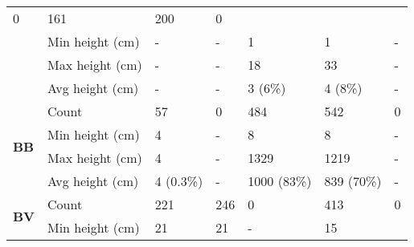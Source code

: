 \begin{longtable}{|p{2cm}|p{2cm}|p{1.5cm}|p{1.5cm}|p{1.5cm}|p{1.5cm}|p{1.5cm}|}
						\multicolumn{1}{l|}{0} &
						\multicolumn{1}{l|}{161} & 
						\multicolumn{1}{l|}{200} &
						\multicolumn{1}{l|}{0} \\\cline{2-7} &
						\multicolumn{1}{l|}{Min height (cm)} & 
						\multicolumn{1}{l|}{-} & 
						\multicolumn{1}{l|}{-} &
						\multicolumn{1}{l|}{1} & 
						\multicolumn{1}{l|}{1} &
						\multicolumn{1}{l|}{-} \\\cline{2-7} &
						\multicolumn{1}{l|}{Max height (cm)} & 
						\multicolumn{1}{l|}{-} & 
						\multicolumn{1}{l|}{-} &
						\multicolumn{1}{l|}{18} & 
						\multicolumn{1}{l|}{33} &
						\multicolumn{1}{l|}{-} \\\cline{2-7} &
						\multicolumn{1}{l|}{Avg height (cm)} & 
						\multicolumn{1}{l|}{-} & 
						\multicolumn{1}{l|}{-} &
						\multicolumn{1}{l|}{3 (6\%)} & 
						\multicolumn{1}{l|}{4 (8\%)} & 
						\multicolumn{1}{l|}{-} \\\cline{2-7}
		\hline            
		\multirow{4}{*}{\textbf{BB}} & 
						\multicolumn{1}{l|}{Count} & 
						\multicolumn{1}{l|}{57} & 
						\multicolumn{1}{l|}{0} &
						\multicolumn{1}{l|}{484} & 
						\multicolumn{1}{l|}{542} &
						\multicolumn{1}{l|}{0} \\\cline{2-7} &
						\multicolumn{1}{l|}{Min height (cm)} & 
						\multicolumn{1}{l|}{4} & 
						\multicolumn{1}{l|}{-} &
						\multicolumn{1}{l|}{8} & 
						\multicolumn{1}{l|}{8} &
						\multicolumn{1}{l|}{-} \\\cline{2-7} &
						\multicolumn{1}{l|}{Max height (cm)} & 
						\multicolumn{1}{l|}{4} & 
						\multicolumn{1}{l|}{-} &
						\multicolumn{1}{l|}{1329} & 
						\multicolumn{1}{l|}{1219} &
						\multicolumn{1}{l|}{-} \\\cline{2-7} &
						\multicolumn{1}{l|}{Avg height (cm)} & 
						\multicolumn{1}{l|}{4 (0.3\%)} & 
						\multicolumn{1}{l|}{-} &
						\multicolumn{1}{l|}{1000 (83\%)} & 
						\multicolumn{1}{l|}{839 (70\%)} & 
						\multicolumn{1}{l|}{-} \\\cline{2-7}
		\hline            
		\multirow{4}{*}{\textbf{BV}} & 
						\multicolumn{1}{l|}{Count} & 
						\multicolumn{1}{l|}{221} & 
						\multicolumn{1}{l|}{246} &
						\multicolumn{1}{l|}{0} & 
						\multicolumn{1}{l|}{413} &
						\multicolumn{1}{l|}{0} \\\cline{2-7} &
						\multicolumn{1}{l|}{Min height (cm)} & 
						\multicolumn{1}{l|}{21} & 
						\multicolumn{1}{l|}{21} &
						\multicolumn{1}{l|}{-} & 
						\multicolumn{1}{l|}{15} &

\end{longtable}
